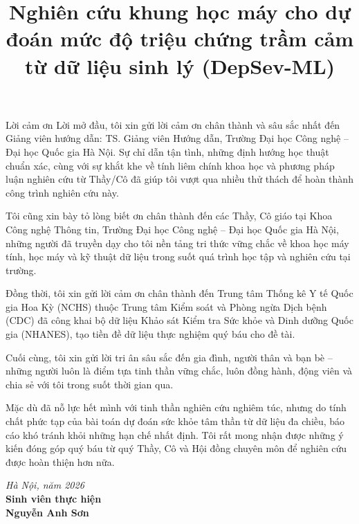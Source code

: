 \documentclass{uetgraduation}
\begin{document}
\title{Nghiên cứu khung học máy cho dự đoán mức độ triệu chứng trầm cảm từ dữ liệu sinh lý (DepSev-ML)}

\makecovers

\pagestyle{plain}

\begin{preamble}{Lời cảm ơn}
Lời mở đầu, tôi xin gửi lời cảm ơn chân thành và sâu sắc nhất đến Giảng viên hướng dẫn: TS. Giảng viên Hướng dẫn, Trường Đại học Công nghệ -- Đại học Quốc gia Hà Nội. Sự chỉ dẫn tận tình, những định hướng học thuật chuẩn xác, cùng với sự khắt khe về tính liêm chính khoa học và phương pháp luận nghiên cứu từ Thầy/Cô đã giúp tôi vượt qua nhiều thử thách để hoàn thành công trình nghiên cứu này.

Tôi cũng xin bày tỏ lòng biết ơn chân thành đến các Thầy, Cô giáo tại Khoa Công nghệ Thông tin, Trường Đại học Công nghệ -- Đại học Quốc gia Hà Nội, những người đã truyền dạy cho tôi nền tảng tri thức vững chắc về khoa học máy tính, học máy và kỹ thuật dữ liệu trong suốt quá trình học tập và nghiên cứu tại trường.

Đồng thời, tôi xin gửi lời cảm ơn chân thành đến Trung tâm Thống kê Y tế Quốc gia Hoa Kỳ (NCHS) thuộc Trung tâm Kiểm soát và Phòng ngừa Dịch bệnh (CDC) đã công khai bộ dữ liệu Khảo sát Kiểm tra Sức khỏe và Dinh dưỡng Quốc gia (NHANES), tạo tiền đề dữ liệu thực nghiệm quý báu cho đề tài.

Cuối cùng, tôi xin gửi lời tri ân sâu sắc đến gia đình, người thân và bạn bè -- những người luôn là điểm tựa tinh thần vững chắc, luôn đồng hành, động viên và chia sẻ với tôi trong suốt thời gian qua.

Mặc dù đã nỗ lực hết mình với tinh thần nghiên cứu nghiêm túc, nhưng do tính chất phức tạp của bài toán dự đoán sức khỏe tâm thần từ dữ liệu đa chiều, báo cáo khó tránh khỏi những hạn chế nhất định. Tôi rất mong nhận được những ý kiến đóng góp quý báu từ quý Thầy, Cô và Hội đồng chuyên môn để nghiên cứu được hoàn thiện hơn nữa.

\vspace{1.5cm}
\begin{flushright}
\textit{Hà Nội, năm 2026}\\[0.2cm]
\textbf{Sinh viên thực hiện}\\[1.5cm]
\textbf{Nguyễn Anh Sơn}
\end{flushright}
\end{preamble}
\end{document}
